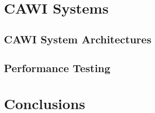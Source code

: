 \section{CAWI Systems}\label{sec:literature:cawiSystems}
	
	\subsection{CAWI System Architectures}\label{sec:literature:architectures}
		
	\subsection{Performance Testing}\label{sec:literature:performanceTesting}
		

\section{Conclusions}
	





